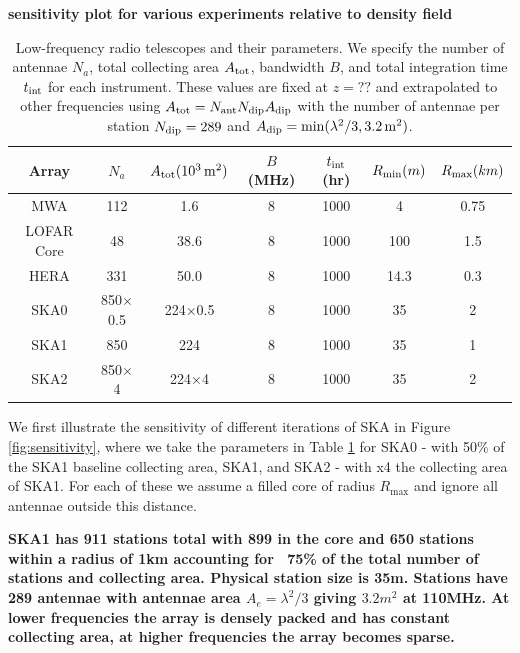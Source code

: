 \documentclass{PoS}
\begin{document}
{\bf sensitivity plot for various experiments relative to density field}

\begin{table}[htdp]
\caption{Low-frequency radio telescopes and their parameters.  We specify the number of antennae $N_a$, total collecting area $A_{\rm tot}$, bandwidth $B$, and total integration time $t_{\rm int}$ for each instrument. These values are fixed at $z=??$ and extrapolated to other frequencies using $A_{\rm tot}=N_{\rm ant}N_{\rm dip}A_{\rm dip}$ with the number of antennae per station $N_{\rm dip}=289$ and $A_{\rm dip}=\min(\lambda^2/3,3.2\,{ \rm m^2})$.}
\begin{center}
\begin{tabular}{ccccccc}
\hline
\hline
Array & $N_a$ & $A_{\rm tot}(10^3\,{\rm m^2})$ & $B$ (MHz) & $t_{\rm int}$ (hr)& $R_{\rm min} (m)$ & $R_{\rm max} (km)$\\
\hline
MWA & 112 & 1.6  & 8 & 1000 & 4 & 0.75\\
LOFAR Core & 48 & 38.6  & 8 & 1000 & 100 & 1.5\\
HERA & 331 & 50.0  & 8 & 1000 & 14.3 & 0.3\\
SKA0 & 850$\times$0.5 & 224$\times$0.5  & 8 & 1000 & 35 & 2\\
SKA1 & 850 & 224  & 8 & 1000 & 35 & 1\\
SKA2 & 850$\times$4 & 224$\times$4 & 8 & 1000 & 35 & 2\\
\hline
\hline
\end{tabular}
\end{center}
\label{tab:telescopes}
\end{table}%

We first illustrate the sensitivity of different iterations of SKA in Figure \ref{fig:sensitivity}, where we take the parameters in Table \ref{tab:telescopes} for SKA0 - with 50\% of the SKA1 baseline collecting area, SKA1, and SKA2 - with x4 the collecting area of SKA1. For each of these we assume a filled core of radius $R_{\max}$ and ignore all antennae outside this distance. 

{\bf SKA1 has 911 stations total with 899 in the core and 650 stations within a radius of 1km accounting for ~75\% of the total number of stations and collecting area. Physical station size is 35m. Stations have 289 antennae with antennae area $A_e=\lambda^2/3$ giving $3.2m^2$ at 110MHz. At lower frequencies the array is densely packed and has constant collecting area, at higher frequencies the array becomes sparse.}
\end{document}
